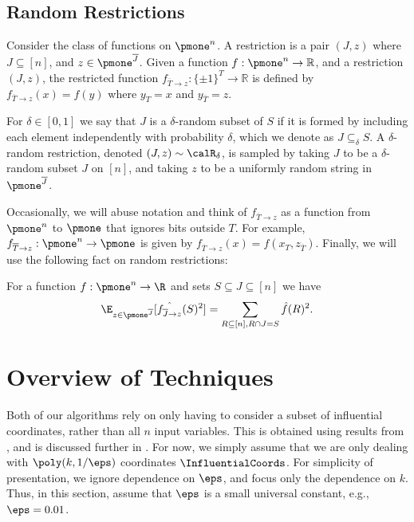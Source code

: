 \subsection{Random Restrictions}

%
\begin{definition}[Restriction]
\label{function-restriction}
Consider the class of  functions on $\pmone^n$.
A restriction is a pair $(J, z)$ where $J \subseteq[n]$, and $z \in \pmone^{\overline{J}}$.
Given a function $f:\pmone^n \to \mathbb{R}$, and a  restriction $(J,z)$, the {\sf restricted function} $f_{\overline{T} \to z}: \{\pm 1\}^{T} \to \mathbb R$ is defined by $f_{\overline{T} \to z}(x) = f(y)$ where $y_T = x$ and $y_{\overline{T}} = z$.
\end{definition}
\begin{definition}
\label{definition:random-restriction}
For $\delta \in [0,1]$ we say that $J$ is a {\sf $\delta$-random subset} of $S$ if it is formed by including each element independently with probability $\delta$, which we denote as $J \subseteq_\delta S$. 
A $\delta$-random restriction, denoted $(J,z) \sim \calR_\delta$, is sampled by taking $J$ to be a $\delta$-random subset $J$ on $[n]$, and taking $z$ to be a  uniformly random string in $\pmone^{\overline{J}}$.\end{definition}

%
%
%

Occasionally, we will abuse notation and think of $f_{\overline{T} \to z}$ as a function from $\pmone^n$ to $\pmone$ that ignores bits outside $T$. For example, $f_{\overline{T} \to z}: \pmone^n \to \pmone$ is given by $f_{\overline{T} \to z}(x) = f(x_T, z_{\overline{T}})$. Finally, we will use the following fact on random restrictions:

\begin{fact}
\label{fact:expected_square}
For a function $f: \pmone^n \to \R$ and sets $S\subseteq J \subseteq [n]$ we have 
$$
\E_{z \in \pmone^{\overline{J}}}[\hat{f_{\overline{J} \to z}}(S)^2] = \sum_{\substack{R \subseteq [n] ,  R\cap J= S}} \hat{f}(R)^2.
$$
\end{fact}





%
\section{Overview of Techniques}
\label{section:techniques}
Both of our algorithms rely on only having to consider a subset of influential coordinates, rather than all $n$ input variables. This is obtained using results from \cite{junta-coordinate-oracles}, and is discussed further in . For now, we simply assume that we are only dealing with $\poly(k,1/\eps)$ coordinates $\InfluentialCoords$. 
For  simplicity of presentation, we ignore dependence  on $\eps$, and focus only the dependence on $k$.  Thus, in this section, assume that $\eps$ is a small universal constant, e.g., $\eps = 0.01$.

